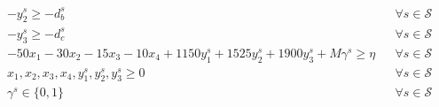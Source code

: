 \documentclass[7pt]{article}
\begin{document}
\begin{align*}
     & -y_2^s \geq -d_b^s                                                                             &  & \forall s \in \mathcal{S} \\
     & -y_3^s \geq -d_c^s                                                                             &  & \forall s \in \mathcal{S} \\
     & - 50 x_1 - 30 x_2 - 15 x_3 - 10 x_4 + 1150y_1^s + 1525y_2^s + 1900 y_3^s + M\gamma^s \geq \eta &  & \forall s \in \mathcal{S} \\
     & x_1, x_2, x_3, x_4, y_1^s, y_2^s, y_3^s \geq 0                                                 &  & \forall s \in \mathcal{S} \\
     & \gamma^s \in \{0,1\}                                                                           &  & \forall s \in \mathcal{S}
\end{align*}
\end{document}

